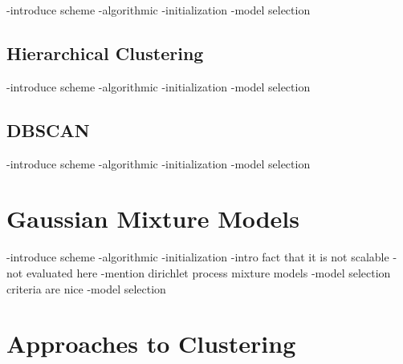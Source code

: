 -introduce scheme
-algorithmic
-initialization
-model selection

\subsection{Hierarchical Clustering}
\label{subsec:chap10-agglomerative}

-introduce scheme
-algorithmic
-initialization
-model selection

\subsection{DBSCAN}
\label{subsec:chap10-dbscan}

-introduce scheme
-algorithmic
-initialization
-model selection

\section{Gaussian Mixture Models}
\label{sec:chap10-gmms}

-introduce scheme
-algorithmic
-initialization
-intro fact that it is not scalable - not evaluated here
-mention dirichlet process mixture models
-model selection criteria are nice
-model selection


\section{Approaches to Clustering}
\label{sec:chap10-cluster}

